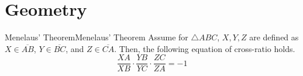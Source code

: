 \documentclass[../../../main.tex]{subfiles}
\begin{document}
\section{Geometry}

\begin{theorem}{Menelaus' Theorem}{Menelaus' Theorem}
Assume for $\triangle{ABC}$, $X, Y, Z$ are defined as $X \in
\overline{AB}$, $Y \in \overline{BC}$, and $Z \in \overline{CA}$.
Then, the following equation of cross-ratio holds.
\[
\frac{XA}{XB} \cdot \frac{YB}{YC} \cdot \frac{ZC}{ZA} = -1
\]
\end{theorem}
\end{document}
